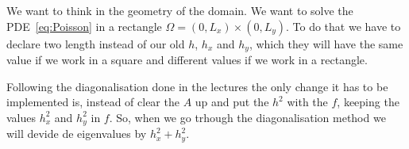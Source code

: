 \documentclass[fontsize=11pt,paper=a4,titlepage]{report}
\begin{document}



We want to think in the geometry of the domain. We want to solve the
PDE~\ref{eq:Poisson} in a rectangle $\Omega = (0, L_x) \times (0, L_y)$. To do
that we have to declare two length instead of our old $h$, $h_x$ and $h_y$,
which they will have the same value if we work in a square and different values
if we work in a rectangle.

Following the diagonalisation done in the lectures the only change it has to be
implemented is, instead of clear the $A$ up and put the $h^2$ with the $f$, 
keeping the values $h_x^2$ and $h_y^2$ in $f$. So, when we go trhough the 
diagonalisation method we will devide de eigenvalues by $h_x^2 + h_y^2$.

\end{document}
